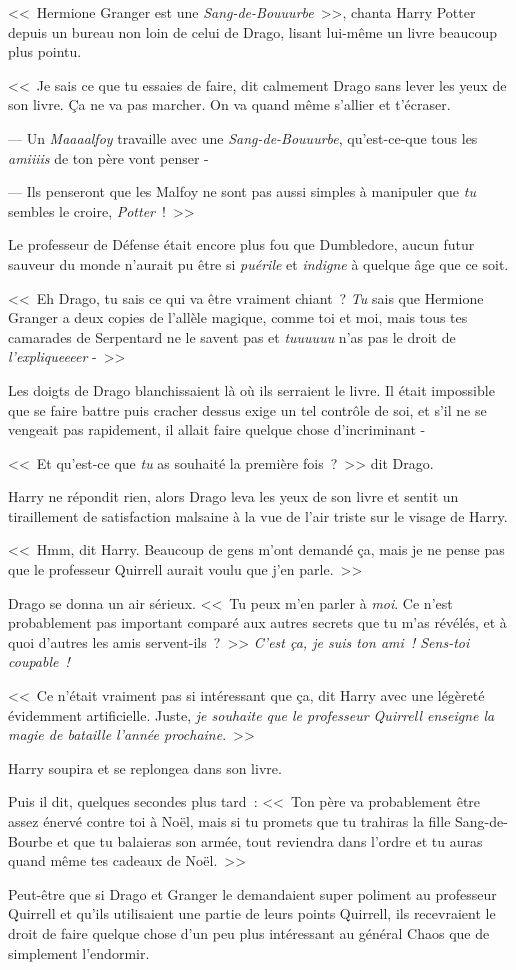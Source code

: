 <<~Hermione Granger est une \emph{Sang-de-Bouuurbe}~>>, chanta Harry Potter depuis un bureau non loin de celui de Drago, lisant lui-même un livre beaucoup plus pointu.

<<~Je sais ce que tu essaies de faire, dit calmement Drago sans lever les yeux de son livre. Ça ne va pas marcher. On va quand même s'allier et t'écraser.

--- Un \emph{Maaaalfoy} travaille avec une \emph{Sang-de-Bouuurbe}, qu'est-ce-que tous les \emph{amiiiis} de ton père vont penser -

--- Ils penseront que les Malfoy ne sont pas aussi simples à manipuler que \emph{tu} sembles le croire, \emph{Potter}~!~>>

Le professeur de Défense était encore plus fou que Dumbledore, aucun futur sauveur du monde n'aurait pu être si \emph{puérile} et \emph{indigne} à quelque âge que ce soit.

<<~Eh Drago, tu sais ce qui va être vraiment chiant~? \emph{Tu} sais que Hermione Granger a deux copies de l'allèle magique, comme toi et moi, mais tous tes camarades de Serpentard ne le savent pas et \emph{tuuuuuu} n'as pas le droit de \emph{l'expliqueeeer} -~>>

Les doigts de Drago blanchissaient là où ils serraient le livre. Il était impossible que se faire battre puis cracher dessus exige un tel contrôle de soi, et s'il ne se vengeait pas rapidement, il allait faire quelque chose d'incriminant -

<<~Et qu'est-ce que \emph{tu} as souhaité la première fois~?~>> dit Drago.

Harry ne répondit rien, alors Drago leva les yeux de son livre et sentit un tiraillement de satisfaction malsaine à la vue de l'air triste sur le visage de Harry.

<<~Hmm, dit Harry. Beaucoup de gens m'ont demandé ça, mais je ne pense pas que le professeur Quirrell aurait voulu que j'en parle.~>>

Drago se donna un air sérieux. <<~Tu peux m'en parler à \emph{moi}. Ce n'est probablement pas important comparé aux autres secrets que tu m'as révélés, et à quoi d'autres les amis servent-ils~?~>> \emph{C'est ça, je suis ton ami~! Sens-toi coupable~!}

<<~Ce n'était vraiment pas si intéressant que ça, dit Harry avec une légèreté évidemment artificielle. Juste, \emph{je souhaite que le professeur Quirrell enseigne la magie de bataille l'année prochaine}.~>>

Harry soupira et se replongea dans son livre.

Puis il dit, quelques secondes plus tard~: <<~Ton père va probablement être assez énervé contre toi à Noël, mais si tu promets que tu trahiras la fille Sang-de-Bourbe et que tu balaieras son armée, tout reviendra dans l'ordre et tu auras quand même tes cadeaux de Noël.~>>

Peut-être que si Drago et Granger le demandaient super poliment au professeur Quirrell et qu'ils utilisaient une partie de leurs points Quirrell, ils recevraient le droit de faire quelque chose d'un peu plus intéressant au général Chaos que de simplement l'endormir.~
